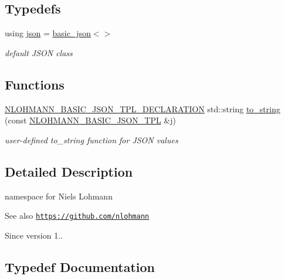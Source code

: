 \subsection*{Typedefs}
\begin{DoxyCompactItemize}
\item 
using \hyperlink{namespacenlohmann_a2bfd99e845a2e5cd90aeaf1b1431f474}{json} = \hyperlink{classnlohmann_1_1basic__json}{basic\+\_\+json}$<$$>$
\begin{DoxyCompactList}\small\item\em default J\+S\+ON class \end{DoxyCompactList}\end{DoxyCompactItemize}
\subsection*{Functions}
\begin{DoxyCompactItemize}
\item 
\hyperlink{macro__scope_8hpp_a0643bd74c2dc6f0e4e420b8190ea8f0f}{N\+L\+O\+H\+M\+A\+N\+N\+\_\+\+B\+A\+S\+I\+C\+\_\+\+J\+S\+O\+N\+\_\+\+T\+P\+L\+\_\+\+D\+E\+C\+L\+A\+R\+A\+T\+I\+ON} std\+::string \hyperlink{namespacenlohmann_a6ce645a0b8717757e096a5b5773b7a16}{to\+\_\+string} (const \hyperlink{macro__scope_8hpp_a80b7254e63f199a1f656f07ae551f632}{N\+L\+O\+H\+M\+A\+N\+N\+\_\+\+B\+A\+S\+I\+C\+\_\+\+J\+S\+O\+N\+\_\+\+T\+PL} \&j)
\begin{DoxyCompactList}\small\item\em user-\/defined to\+\_\+string function for J\+S\+ON values \end{DoxyCompactList}\end{DoxyCompactItemize}


\subsection{Detailed Description}
namespace for Niels Lohmann 

\begin{DoxySeeAlso}{See also}
\href{https://github.com/nlohmann}{\tt https\+://github.\+com/nlohmann} 
\end{DoxySeeAlso}
\begin{DoxySince}{Since}
version 1.. 
\end{DoxySince}


\subsection{Typedef Documentation}
